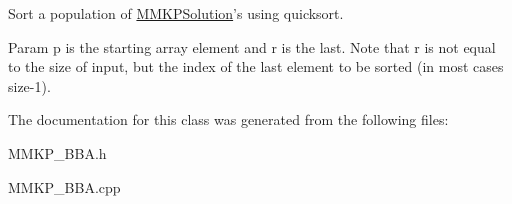 Sort a population of \hyperlink{class_m_m_k_p_solution}{M\+M\+K\+P\+Solution}'s using quicksort. 

Param p is the starting array element and r is the last. Note that r is not equal to the size of input, but the index of the last element to be sorted (in most cases size-\/1). 

The documentation for this class was generated from the following files\+:\begin{DoxyCompactItemize}
\item 
M\+M\+K\+P\+\_\+\+B\+B\+A.\+h\item 
M\+M\+K\+P\+\_\+\+B\+B\+A.\+cpp\end{DoxyCompactItemize}
